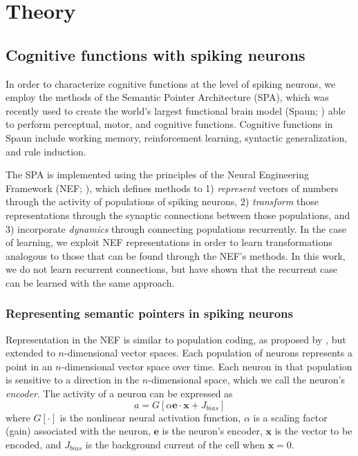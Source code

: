 \documentclass[10pt,letterpaper]{article}
\begin{document}
\section{Theory}

\subsection{Cognitive functions with spiking neurons}

In order to characterize cognitive functions
at the level of spiking neurons,
we employ the methods of the Semantic Pointer Architecture (SPA),
which was recently used to create the world's largest
functional brain model (Spaun; )
able to perform perceptual, motor, and cognitive functions.
Cognitive functions in Spaun include working memory,
reinforcement learning, syntactic generalization,
and rule induction.

The SPA is implemented using the principles of
the Neural Engineering Framework (NEF; ),
which defines methods to
1) \textit{represent} vectors of numbers
through the activity of populations of spiking neurons,
2) \textit{transform} those representations through
the synaptic connections between those populations, and
3) incorporate \textit{dynamics} through
connecting populations recurrently.
In the case of learning,
we exploit NEF representations in order to
learn transformations analogous
to those that can be found through the NEF's methods.
In this work, we do not learn recurrent connections,
but  have shown that the recurrent case
can be learned with the same approach.

\subsubsection{Representing semantic pointers in spiking neurons}

Representation in the NEF is
similar to population coding, as proposed by
,
but extended to $n$-dimensional vector spaces.
Each population of neurons represents
a point in an $n$-dimensional vector space over time.
Each neuron in that population is sensitive to
a direction in the $n$-dimensional space,
which we call the neuron's \textit{encoder}.
The activity of a neuron can be expressed as
\begin{equation}
  a = G[\alpha \mathbf{e} \cdot \mathbf{x} + J_{bias}]
\end{equation}
where $G[\cdot]$ is the nonlinear neural activation function,
$\alpha$ is a scaling factor (gain) associated with the neuron,
$\mathbf{e}$ is the neuron's encoder,
$\mathbf{x}$ is the vector to be encoded, and
$J_{bias}$ is the background current of the cell
when $\mathbf{x} = 0$.
\end{document}
